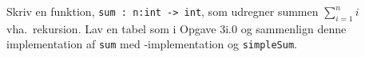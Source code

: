 Skriv en funktion, \lstinline{sum : n:int -> int}, som udregner summen $\sum_{i=1}^ni$ vha.\ rekursion. Lav en tabel som i Opgave 3i.0 og sammenlign denne implementation af \lstinline{sum} med -implementation og \lstinline{simpleSum}.
